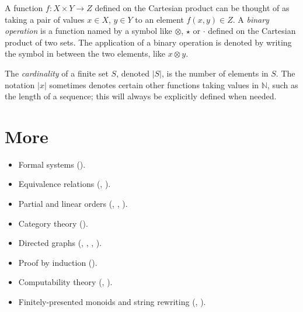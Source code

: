 \documentclass[../generics]{subfiles}
\begin{document}
A function $f\colon X\times Y\rightarrow Z$ defined on the Cartesian product can be thought of as taking a pair of values $x\in X$, $y\in Y$ to an element $f(x,y)\in Z$. A \emph{binary operation} is a function named by a symbol like $\otimes$, $\star$ or $\cdot$ defined on the Cartesian product of two sets. The application of a binary operation is denoted by writing the symbol in between the two elements, like $x\otimes y$.

The \emph{cardinality} of a finite set $S$, denoted $|S|$, is the number of elements in $S$. The notation $|x|$ sometimes denotes certain other functions taking values in $\mathbb{N}$, such as the length of a sequence; this will always be explicitly defined when needed.

\section*{More}

\begin{itemize}
\item Formal systems ().
\item Equivalence relations (, ).
\item Partial and linear orders (, , ).
\item Category theory ().
\item Directed graphs (, , , ).
\item Proof by induction ().
\item Computability theory (, ).
\item Finitely-presented monoids and string rewriting (, ).
\end{itemize}
\end{document}
